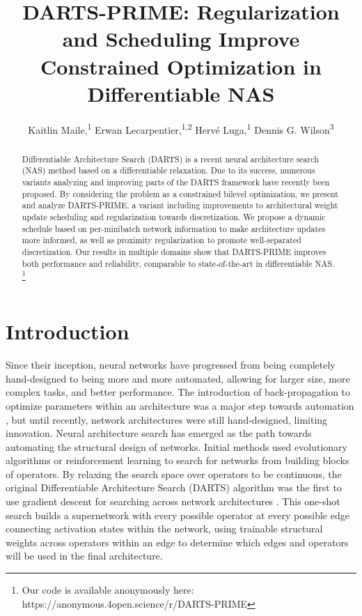 \documentclass[letterpaper]{article} \usepackage{aaai22}  \usepackage{times}  \usepackage{helvet}  \usepackage{courier}  \usepackage[hyphens]{url}  \usepackage{graphicx} \urlstyle{rm} \def\UrlFont{\rm}  \usepackage{natbib}  \usepackage{caption} \DeclareCaptionStyle{ruled}{labelfont=normalfont,labelsep=colon,strut=off} \frenchspacing  \setlength{\pdfpagewidth}{8.5in}  \setlength{\pdfpageheight}{11in}  \usepackage{algorithm}
\title{DARTS-PRIME: Regularization and Scheduling Improve Constrained Optimization in Differentiable NAS}
\author{
        Kaitlin Maile,\textsuperscript{\rm 1} 
        Erwan Lecarpentier,\textsuperscript{\rm 1,2} 
        Herv\'e Luga,\textsuperscript{\rm 1} 
        Dennis G. Wilson\textsuperscript{\rm 3}
    }
\begin{document}
\maketitle
\begin{abstract} Differentiable Architecture Search (DARTS) is a recent neural architecture search (NAS) method based on a differentiable relaxation. Due to its success, numerous variants analyzing and improving parts of the DARTS framework have recently been proposed. By considering the problem as a constrained bilevel optimization, we present and analyze DARTS-PRIME, a variant including improvements to architectural weight update scheduling and regularization towards discretization. We propose a dynamic schedule based on per-minibatch network information to make architecture updates more informed, as well as proximity regularization to promote well-separated discretization. Our results in multiple domains show that DARTS-PRIME improves both performance and reliability, comparable to state-of-the-art in differentiable NAS. \footnote{Our code is available anonymously here: https://anonymous.4open.science/r/DARTS-PRIME}
\end{abstract}

\section{Introduction}

Since their inception, neural networks have progressed from being completely hand-designed to being more and more automated, allowing for larger size, more complex tasks, and better performance. The introduction of back-propagation to optimize parameters within an architecture was a major step towards automation \cite{rumelhart1986}, but until recently, network architectures were still hand-designed, limiting innovation. Neural architecture search has emerged as the path towards automating the structural design of networks. Initial methods used evolutionary algorithms \cite{real2019regularized} or reinforcement learning \cite{zoph2017neural} to search for networks from building blocks of operators. By relaxing the search space over operators to be continuous, the original Differentiable Architecture Search (DARTS) algorithm was the first to use gradient descent for searching across network architectures \cite{liu2018darts}. This one-shot search builds a supernetwork with every possible operator at every possible edge connecting activation states within the network, using trainable structural weights across operators within an edge to determine which edges and operators will be used in the final architecture.
\end{document}

